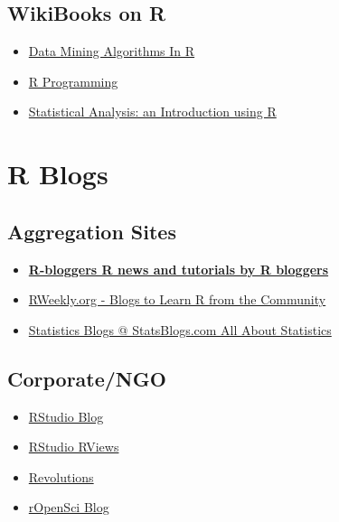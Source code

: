 \documentclass[]{book}
\providecommand{\tightlist}{%
  \setlength{\itemsep}{0pt}\setlength{\parskip}{0pt}}
\theoremstyle{definition}
\theoremstyle{definition}
\theoremstyle{definition}
\theoremstyle{remark}
\begin{document}
\hypertarget{wikibooks-on-r}{%
\subsection{WikiBooks on R}\label{wikibooks-on-r}}

\begin{itemize}
\tightlist
\item
  \href{https://en.wikibooks.org/wiki/Data_Mining_Algorithms_In_R}{Data
  Mining Algorithms In R}
\item
  \href{https://en.wikibooks.org/wiki/R_Programming}{R Programming}
\item
  \href{https://en.wikibooks.org/wiki/Statistical_Analysis:_an_Introduction_using_R}{Statistical
  Analysis: an Introduction using R}
\end{itemize}

\hypertarget{r-blogs}{%
\section{R Blogs}\label{r-blogs}}

\hypertarget{aggregation-sites}{%
\subsection{Aggregation Sites}\label{aggregation-sites}}

\begin{itemize}
\tightlist
\item
  \href{https://www.r-bloggers.com/}{\textbf{R-bloggers \textbar{} R
  news and tutorials by R bloggers}}
\item
  \href{https://rweekly.org/}{RWeekly.org - Blogs to Learn R from the
  Community}
\item
  \href{http://www.statsblogs.com/}{Statistics Blogs @ StatsBlogs.com
  \textbar{} All About Statistics \textbar{}}
\end{itemize}

\hypertarget{corporatengo}{%
\subsection{Corporate/NGO}\label{corporatengo}}

\begin{itemize}
\tightlist
\item
  \href{https://blog.rstudio.org/}{RStudio Blog}
\item
  \href{https://rviews.rstudio.com/}{RStudio RViews}
\item
  \href{http://blog.revolutionanalytics.com/}{Revolutions}
\item
  \href{https://ropensci.org/blog/}{rOpenSci Blog}
\end{itemize}
\end{document}
